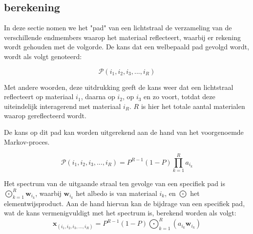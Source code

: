 \documentclass[12pt]{report}
\DeclareMathOperator*{\Odot}{\bigodot}
\begin{document}

\subsection{berekening}

In deze sectie nomen we het "pad" van een lichtstraal de verzameling van de verschillende endmembers waarop het materiaal reflecteert, waarbij er rekening wordt gehouden met de volgorde. De kans dat een welbepaald pad gevolgd wordt, wordt als volgt genoteerd:

\begin{equation}
\mathcal{P}(i_1,i_2,i_3,...,i_R)
\end{equation}

Met andere woorden, deze uitdrukking geeft de kans weer dat een lichtstraal reflecteert op materiaal $i_1$, daarna op $i_2$, op $i_3$ en zo voort, totdat deze uiteindelijk interagerend met materiaal $i_R$. $R$ is hier het totale aantal materialen waarop gereflecteerd wordt.

De kans op dit pad kan worden uitgerekend aan de hand van het voorgenoemde Markov-proces\cite{mlinmix}. 

\begin{equation}
\mathcal{P}(i_1,i_2,i_3,...,i_R) = P^{R-1} (1-P) \prod_{k=1}^R a_{i_k}
\end{equation}

Het spectrum van de uitgaande straal ten gevolge van een specifiek pad is $\Odot_{k=1}^R \bm{w}_{i_k}$, waarbij $\bm{w}_{i_k}$ het albedo is van materiaal $i_k$, en $\Odot$ het elementwijsproduct. Aan de hand hiervan kan de bijdrage van een specifiek pad, wat de kans vermenigvuldigt met het spectrum is, berekend worden als volgt:
\begin{equation}
\bm{x}_{(i_1,i_2,i_3,...,i_R)} = P^{R-1} (1-P) \Odot_{k=1}^R \left(a_{i_k} \bm{w}_{i_k}\right)
\end{equation}
\end{document}
